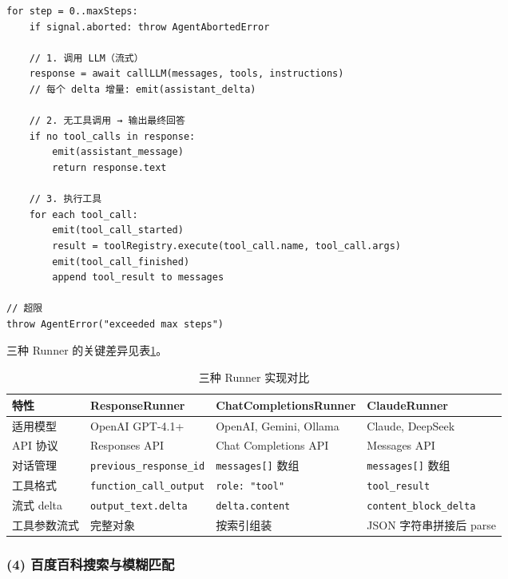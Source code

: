 \documentclass[12pt,a4paper]{ctexart}
\begin{document}
\begin{lstlisting}[caption={Runner 核心循环伪代码}, label={lst:loop}]
for step = 0..maxSteps:
    if signal.aborted: throw AgentAbortedError

    // 1. 调用 LLM（流式）
    response = await callLLM(messages, tools, instructions)
    // 每个 delta 增量: emit(assistant_delta)

    // 2. 无工具调用 → 输出最终回答
    if no tool_calls in response:
        emit(assistant_message)
        return response.text

    // 3. 执行工具
    for each tool_call:
        emit(tool_call_started)
        result = toolRegistry.execute(tool_call.name, tool_call.args)
        emit(tool_call_finished)
        append tool_result to messages

// 超限
throw AgentError("exceeded max steps")
\end{lstlisting}

三种 Runner 的关键差异见表\ref{tab:runners}。

\begin{table}[H]
  \centering
  \caption{三种 Runner 实现对比}
  \label{tab:runners}
  \begin{tabular}{@{}p{2.5cm}p{3.5cm}p{3.5cm}p{3.5cm}@{}}
    \toprule
    \textbf{特性} & \textbf{ResponseRunner} &
    \textbf{ChatCompletionsRunner} & \textbf{ClaudeRunner} \\
    \midrule
    适用模型 & OpenAI GPT-4.1+ & OpenAI, Gemini, Ollama &
    Claude, DeepSeek \\
    API 协议 & Responses API & Chat Completions API & Messages API \\
    对话管理 & \texttt{previous\_response\_id} &
    \texttt{messages[]} 数组 & \texttt{messages[]} 数组 \\
    工具格式 & \texttt{function\_call\_output} & \texttt{role:
    "tool"} & \texttt{tool\_result} \\
    流式 delta & \texttt{output\_text.delta} &
    \texttt{delta.content} & \texttt{content\_block\_delta} \\
    工具参数流式 & 完整对象 & 按索引组装 & JSON 字符串拼接后 parse \\
    \bottomrule
  \end{tabular}
\end{table}

\subsubsection{(4) 百度百科搜索与模糊匹配}
\end{document}
